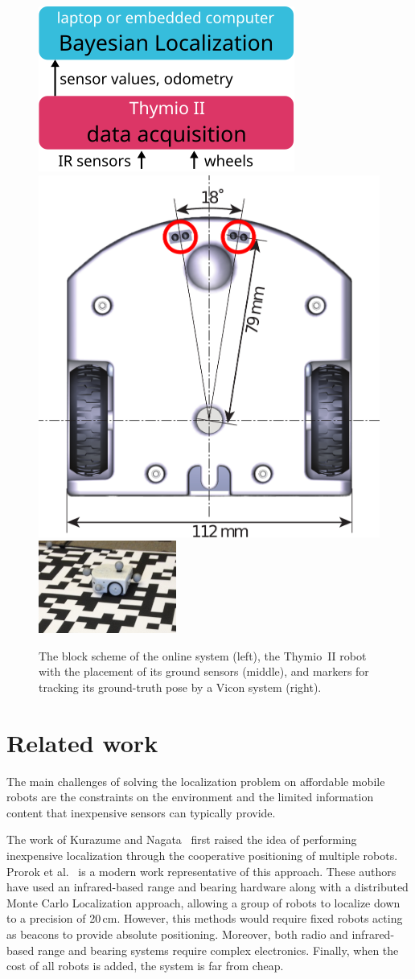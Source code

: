 \documentclass{svmult}
\begin{document}
\begin{figure}
\includegraphics{system-bloc-scheme}\hfill
\includegraphics[height=.24\columnwidth]{thymio2-dimensions}\hfill
\includegraphics[height=.23\columnwidth]{thymio2-dataset}
\vspace{-.07cm}
\caption{The block scheme of the online system (left), the Thymio~II robot with the placement of its ground sensors (middle), and markers for tracking its ground-truth pose by a Vicon system (right).}
\label{fig:thymio}
\end{figure}

\section{Related work}

The main challenges of solving the localization problem on affordable mobile robots are the constraints on the environment and the limited information content that inexpensive sensors can typically provide.

The work of Kurazume and Nagata~\cite{kurazume1994cooperative} first raised the idea of performing inexpensive localization through the cooperative positioning of multiple robots.
Prorok et al.~\cite{prorok2012low} is a modern work representative of this approach.
These authors have used an infrared-based range and bearing hardware along with a distributed Monte Carlo Localization approach, allowing a group of robots to localize down to a precision of 20\,cm.
However, this methods would require fixed robots acting as beacons to provide absolute positioning.
Moreover, both radio and infrared-based range and bearing systems require complex electronics.
Finally, when the cost of all robots is added, the system is far from cheap.
\end{document}
